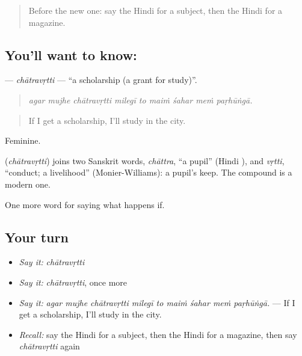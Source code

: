 \label{lesson:HI-C397-chatravrtti}



\begin{quote}
Before the new one: say the Hindi for a subject, then the Hindi for a magazine.
\end{quote}

\subsection*{You'll want to know: }
\textbf{} — \emph{chātravṛtti} — \textquotedblleft{}a scholarship (a grant for study)\textquotedblright{}.

\begin{quote}
        
\end{quote}

\begin{quote}
\emph{agar mujhe chātravṛtti milegī to maiṁ śahar meṁ paṛhūṅgā.}
\end{quote}

\begin{quote}
If I get a scholarship, I'll study in the city.
\end{quote}

Feminine.

\begin{cousinweb}
\textbf{} (\emph{chātravṛtti}) joins two Sanskrit words, \emph{chāttra}, \textquotedblleft{}a pupil\textquotedblright{} (Hindi ), and \emph{vṛtti}, \textquotedblleft{}conduct; a livelihood\textquotedblright{} (Monier-Williams): a pupil's keep. The compound is a modern one.
\end{cousinweb}

\begin{grammarlens}[title={What you've built}]
One more word for saying what happens if.
\end{grammarlens}

\subsection*{Your turn}
\begin{itemize}
\raggedright
  \item \emph{Say it:} \emph{chātravṛtti}
  \item \emph{Say it:} \emph{chātravṛtti}, once more
  \item \emph{Say it:} \emph{agar mujhe chātravṛtti milegī to maiṁ śahar meṁ paṛhūṅgā.} — If I get a scholarship, I'll study in the city.
  \item \emph{Recall:} say the Hindi for a subject, then the Hindi for a magazine, then say \emph{chātravṛtti} again
\end{itemize}


